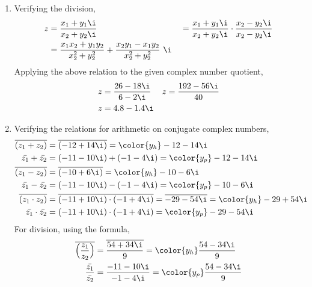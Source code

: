 \begin{enumerate}
    \item Verifying the division,
          \begin{align}
              z & = \frac{x_1 + y_1\i}{x_2 + y_2\i}                 &
                & = \frac{x_1 + y_1\i}{x_2 + y_2\i} \cdot \frac{x_2
              - y_2\i}{x_2 - y_2\i}                                   \\
                & = \frac{x_1x_2 + y_1y_2}{x_2^2 + y_2^2}
              + \frac{x_2y_1 - x_1y_2}{x_2^2 + y_2^2}\ \i
          \end{align}
          Applying the above relation to the given complex number quotient,
          \begin{align}
              z & = \frac{26 - 18\i}{6 - 2\i} &
              z & = \frac{192 - 56\i}{40}       \\
              z & = 4.8 - 1.4\i
          \end{align}

    \item Verifying the relations for arithmetic on conjugate complex numbers,
          \begin{align}
              \overline{(z_1 + z_2)}     & = \overline{(-12 + 14\i)} =
              \color{y_h} -12 - 14\i                                             \\
              \bar{z_1} + \bar{z_2}      & = (-11 - 10\i) + (-1 - 4\i) =
              \color{y_p} -12 - 14\i                                             \\
              \overline{(z_1 - z_2)}     & = \overline{(-10 + 6\i)} =
              \color{y_h} -10 - 6\i                                              \\
              \bar{z_1} - \bar{z_2}      & = (-11 - 10\i) - (-1 - 4\i) =
              \color{y_p} -10 - 6\i                                              \\
              \overline{(z_1 \cdot z_2)} & = \overline{(-11 + 10\i)
              \cdot (-1 + 4\i)} = \overline{-29 - 54\i} = \color{y_h} -29 + 54\i \\
              \bar{z_1} \cdot \bar{z_2}  & = (-11 + 10\i) \cdot (-1 + 4\i)
              =\color{y_p} -29 - 54\i
          \end{align}
          For division, using the formula,
          \begin{align}
              \overline{\Big(
              \frac{z_1}{z_2} \Big)}      & = \overline{\frac{54 + 34\i}{9}}
              = \color{y_h} \frac{54 - 34\i}{9}                              \\
              \frac{\bar{z_1}}{\bar{z_2}} & = \frac{-11 - 10\i}{-1 - 4\i}
              =\color{y_p} \frac{54 - 34\i}{9}
          \end{align}


\end{enumerate}
